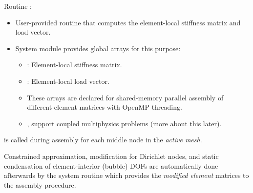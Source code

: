 Routine :
\begin{itemize}
	\item User-provided routine that computes the element-local stiffness matrix and load vector.
	\item System module  provides global arrays for this purpose:
	\begin{itemize}
		\item {}: Element-local stiffness matrix.
		\item {}: Element-local load vector.
		\item These arrays are declared  for shared-memory parallel assembly of different element matrices with OpenMP threading.
		\item {},  support coupled multiphysics problems (more about this later).
	\end{itemize}
\end{itemize}

 is called during assembly for each middle node  in the \emph{active mesh}.

\begin{remark}
Constrained approximation, modification for Dirichlet nodes, and static condensation of element-interior (bubble) DOFs are automatically done afterwards by the system routine  which provides the \emph{modified element} matrices to the assembly procedure.
\end{remark}


